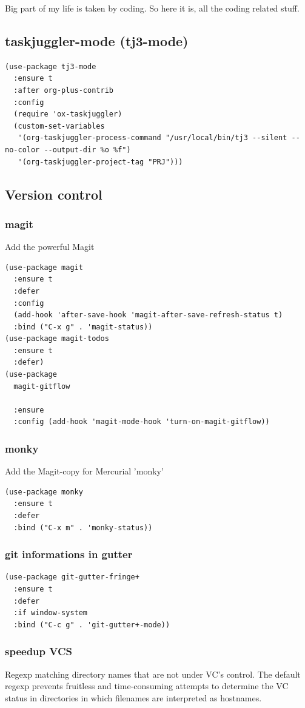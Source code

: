 \documentclass[11pt]{article}
\begin{document}
Big part of my life is taken by coding. So here it is, all the coding
related stuff.
\subsection{taskjuggler-mode (tj3-mode)}
\label{sec:org865f05d}
\begin{verbatim}
(use-package tj3-mode
  :ensure t
  :after org-plus-contrib
  :config
  (require 'ox-taskjuggler)
  (custom-set-variables
   '(org-taskjuggler-process-command "/usr/local/bin/tj3 --silent --no-color --output-dir %o %f")
   '(org-taskjuggler-project-tag "PRJ")))
\end{verbatim}
\subsection{Version control}
\label{sec:org358e8a5}
\subsubsection{magit}
\label{sec:org53d4598}

Add the powerful Magit

\begin{verbatim}
(use-package magit
  :ensure t
  :defer
  :config
  (add-hook 'after-save-hook 'magit-after-save-refresh-status t)
  :bind ("C-x g" . 'magit-status))
(use-package magit-todos
  :ensure t
  :defer)
(use-package
  magit-gitflow

  :ensure
  :config (add-hook 'magit-mode-hook 'turn-on-magit-gitflow))
\end{verbatim}
\subsubsection{monky}
\label{sec:org2f8f91b}
Add the Magit-copy for Mercurial 'monky'

\begin{verbatim}
(use-package monky
  :ensure t
  :defer
  :bind ("C-x m" . 'monky-status))
\end{verbatim}
\subsubsection{git informations in gutter}
\label{sec:org97e3e7b}
\begin{verbatim}
(use-package git-gutter-fringe+
  :ensure t
  :defer
  :if window-system
  :bind ("C-c g" . 'git-gutter+-mode))
\end{verbatim}
\subsubsection{speedup VCS}
\label{sec:org48c9129}
Regexp matching directory names that are not under VC's control. The
default regexp prevents fruitless and time-consuming attempts to
determine the VC status in directories in which filenames are
interpreted as hostnames.
\end{document}
